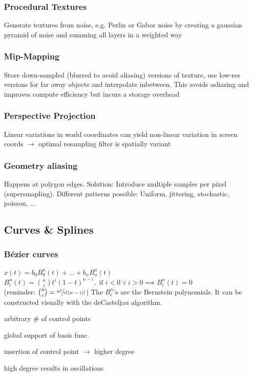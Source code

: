 \documentclass[a4paper,10pt]{article}
\let\svitem\item
\newenvironment{citemize}[1][\relax]{\renewcommand\item[1][black]{\color{##1}\svitem}
  \ifx\relax#1\itemize\else\itemize[#1]\fi}{\enditemize}
\newcommand*\good{\item[goodgreen]}
\newcommand*\bad{\item[badred]}
\begin{document}
\subsubsection{Procedural Textures} Generate textures from noise, e.g. Perlin or Gabor noise by creating a gaussian pyramid of noise and summing all layers in a weighted way
\subsubsection{Mip-Mapping} Store down-sampled (blurred to avoid aliasing) versions of texture, use low-res versions for far away objects and interpolate inbetween. This avoids asliasing and improves compute efficiency but incurs a storage overhead
\subsubsection{Perspective Projection} Linear variations in world coordinates can yield non-linear variation in screen coords \( \to  \) optimal resampling filter is spatially variant
\subsubsection{Geometry aliasing} Happens at polygon edges. Solution: Introduce multiple samples per pixel (supersmapling). Different patterns possible: Uniform, jittering, stochastic, poisson, ...

\subsection{Curves \& Splines}
\subsubsection{Bézier curves}
\( x(t) = b_0 B^n_0(t) + \ldots + b_n B^n_n (t) \) \\
\( B^n_i(t) = \binom{n}{i} t^i (1-t)^{n-i}, \text{ if } i < 0 \lor i >0 \implies B^n_i (t) = 0 \) \\
(reminder: \( \binom{n}{i} = \sfrac{n!}{i!(n-i)!} \)) The \( B^n_i \)'s are the Bernstein polynomials.
It can be constructed visually with the deCasteljau algorithm. 
\begin{citemize}
    \good arbitrary \# of control points
    \bad global support of basis func.
    \bad insertion of control point \( \to  \) higher degree
    \bad high degree results in oscillations
\end{citemize}
\end{document}
